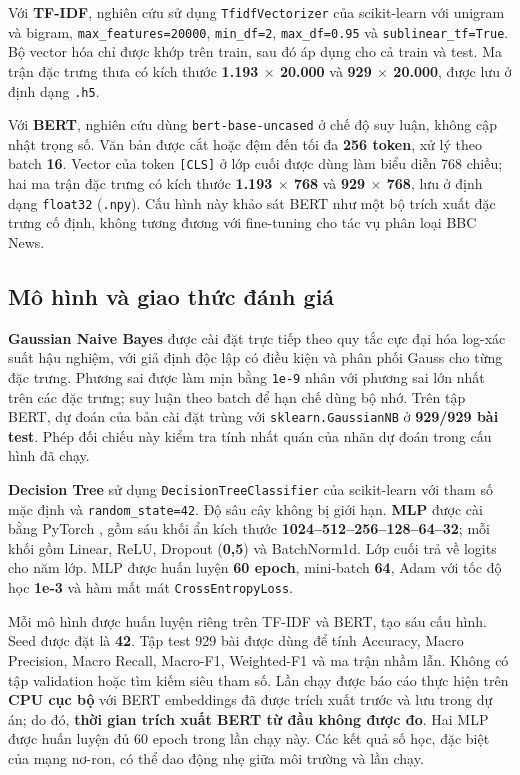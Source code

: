 \documentclass[conference,a4paper]{IEEEtran}
\begin{document}
Với \textbf{TF-IDF}, nghiên cứu sử dụng \texttt{TfidfVectorizer} của scikit-learn \cite{pedregosa2011} với unigram và bigram, \texttt{max\_features=20000}, \texttt{min\_df=2}, \texttt{max\_df=0.95} và \texttt{sublinear\_tf=True}. Bộ vector hóa chỉ được khớp trên train, sau đó áp dụng cho cả train và test. Ma trận đặc trưng thưa có kích thước \textbf{1.193 $\times$ 20.000} và \textbf{929 $\times$ 20.000}, được lưu ở định dạng \texttt{.h5}.

Với \textbf{BERT}, nghiên cứu dùng \texttt{bert-base-uncased} \cite{devlin2019} ở chế độ suy luận, không cập nhật trọng số. Văn bản được cắt hoặc đệm đến tối đa \textbf{256 token}, xử lý theo batch \textbf{16}. Vector của token \texttt{[CLS]} ở lớp cuối được dùng làm biểu diễn 768 chiều; hai ma trận đặc trưng có kích thước \textbf{1.193 $\times$ 768} và \textbf{929 $\times$ 768}, lưu ở định dạng \texttt{float32} (\texttt{.npy}). Cấu hình này khảo sát BERT như một bộ trích xuất đặc trưng cố định, không tương đương với fine-tuning cho tác vụ phân loại BBC News.

\subsection{Mô hình và giao thức đánh giá}

\textbf{Gaussian Naive Bayes} được cài đặt trực tiếp theo quy tắc cực đại hóa log-xác suất hậu nghiệm, với giả định độc lập có điều kiện và phân phối Gauss cho từng đặc trưng. Phương sai được làm mịn bằng \texttt{1e-9} nhân với phương sai lớn nhất trên các đặc trưng; suy luận theo batch để hạn chế dùng bộ nhớ. Trên tập BERT, dự đoán của bản cài đặt trùng với \texttt{sklearn.GaussianNB} ở \textbf{929/929 bài test}. Phép đối chiếu này kiểm tra tính nhất quán của nhãn dự đoán trong cấu hình đã chạy.

\textbf{Decision Tree} sử dụng \texttt{DecisionTreeClassifier} của scikit-learn \cite{pedregosa2011} với tham số mặc định và \texttt{random\_state=42}. Độ sâu cây không bị giới hạn. \textbf{MLP} được cài bằng PyTorch \cite{paszke2019}, gồm sáu khối ẩn kích thước \textbf{1024--512--256--128--64--32}; mỗi khối gồm Linear, ReLU, Dropout (\textbf{0,5}) và BatchNorm1d. Lớp cuối trả về logits cho năm lớp. MLP được huấn luyện \textbf{60 epoch}, mini-batch \textbf{64}, Adam với tốc độ học \textbf{1e-3} và hàm mất mát \texttt{CrossEntropyLoss}.

Mỗi mô hình được huấn luyện riêng trên TF-IDF và BERT, tạo sáu cấu hình. Seed được đặt là \textbf{42}. Tập test 929 bài được dùng để tính Accuracy, Macro Precision, Macro Recall, Macro-F1, Weighted-F1 và ma trận nhầm lẫn. Không có tập validation hoặc tìm kiếm siêu tham số. Lần chạy được báo cáo thực hiện trên \textbf{CPU cục bộ} với BERT embeddings đã được trích xuất trước và lưu trong dự án; do đó, \textbf{thời gian trích xuất BERT từ đầu không được đo}. Hai MLP được huấn luyện đủ 60 epoch trong lần chạy này. Các kết quả số học, đặc biệt của mạng nơ-ron, có thể dao động nhẹ giữa môi trường và lần chạy.
\end{document}
